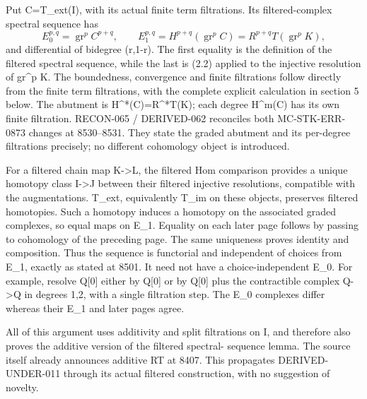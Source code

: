Put C\allowbreak{}=T\_\allowbreak{}ext(I)\allowbreak{},\allowbreak{} with its actual finite term filtrations. Its filtered-complex spectral sequence has \[
 E_0^{p,q}=\operatorname{gr}^p C^{p+q},\qquad
 E_1^{p,q}=H^{p+q}(\operatorname{gr}^p C)
          =R^{p+q}T(\operatorname{gr}^p K),                  \tag{4.2}
\] and differential of bidegree (r,\allowbreak{}1-r)\allowbreak{}. The first equality is the definition of the filtered spectral sequence,\allowbreak{} while the last is (2.2)\allowbreak{} applied to the injective resolution of gr\^{}p K. The boundedness,\allowbreak{} convergence and finite filtrations follow directly from the finite term filtrations,\allowbreak{} with the complete explicit calculation in section 5 below. The abutment is H\textasciicircum{}*(C)\allowbreak{}\allowbreak{}=R\textasciicircum{}*T(K)\allowbreak{}; each degree H\textasciicircum{}m(C)\allowbreak{} has its own finite filtration. RECON-065 /\allowbreak{} DERIVED-062 reconciles both MC-STK-ERR-0873 changes at 8530–\allowbreak{}8531. They state the graded abutment and its per-degree filtrations precisely; no different cohomology object is introduced.

For a filtered chain map K\allowbreak{}->L,\allowbreak{} the filtered Hom comparison provides a unique homotopy class I\allowbreak{}->J between their filtered injective resolutions,\allowbreak{} compatible with the augmentations. T\_\allowbreak{}ext,\allowbreak{} equivalently T\_\allowbreak{}im on these objects,\allowbreak{} preserves filtered homotopies. Such a homotopy induces a homotopy on the associated graded complexes,\allowbreak{} so equal maps on E\_\allowbreak{}1. Equality on each later page follows by passing to cohomology of the preceding page. The same uniqueness proves identity and composition. Thus the sequence is functorial and independent of choices from E\_\allowbreak{}1,\allowbreak{} exactly as stated at 8501. It need not have a choice-independent E\_\allowbreak{}0. For example,\allowbreak{} resolve Q[0]\allowbreak{} either by Q[0]\allowbreak{} or by Q[0]\allowbreak{} plus the contractible complex Q\allowbreak{}->Q in degrees 1,\allowbreak{}2,\allowbreak{} with a single filtration step. The E\_\allowbreak{}0 complexes differ whereas their E\_\allowbreak{}1 and later pages agree.

All of this argument uses additivity and split filtrations on I,\allowbreak{} and therefore also proves the additive version of the filtered spectral- sequence lemma. The source itself already announces additive RT at 8407. This propagates DERIVED-UNDER-011 through its actual filtered construction,\allowbreak{} with no suggestion of novelty.

